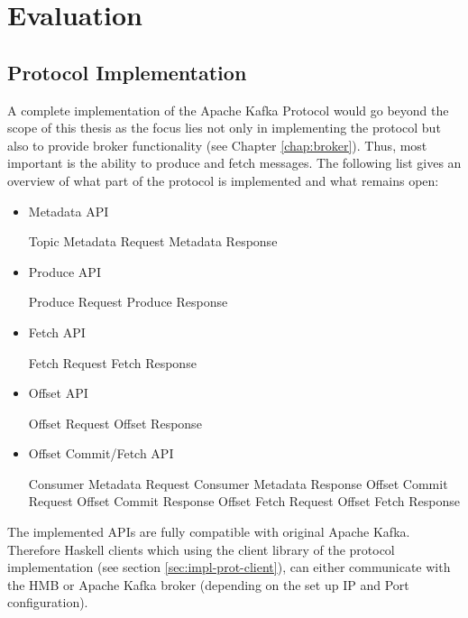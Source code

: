 \chapter{Evaluation}
\section{Protocol Implementation}
A complete implementation of the Apache Kafka Protocol would
go beyond the scope of this thesis as the focus lies not
only in implementing the protocol but also to provide broker
functionality (see Chapter \ref{chap:broker}). Thus, most important is
the ability to produce and fetch messages. The following list gives 
an overview of what part of the protocol is implemented and what remains open:

\begin{itemize}
    \item Metadata API
    \begin{itemize}
        \tick Topic Metadata Request
        \tick Metadata Response
    \end{itemize}
    \item Produce API
    \begin{itemize}
        \tick Produce Request
        \tick Produce Response
    \end{itemize}
    \item Fetch API
    \begin{itemize}
        \tick Fetch Request
        \tick Fetch Response
    \end{itemize}
    \item Offset API
    \begin{itemize}
        \fail Offset Request
        \fail Offset Response
    \end{itemize}

    \item Offset Commit/Fetch API
    \begin{itemize}
        \fail Consumer Metadata Request
        \fail Consumer Metadata Response
        \fail Offset Commit Request
        \fail Offset Commit Response
        \fail Offset Fetch Request
        \fail Offset Fetch Response
    \end{itemize}
\end{itemize}

The implemented APIs are fully compatible with original Apache Kafka.
Therefore Haskell clients which using the client library of the protocol
implementation (see section \ref{sec:impl-prot-client}), can either communicate
with the HMB or Apache Kafka broker (depending on the set up IP and Port
configuration). 

